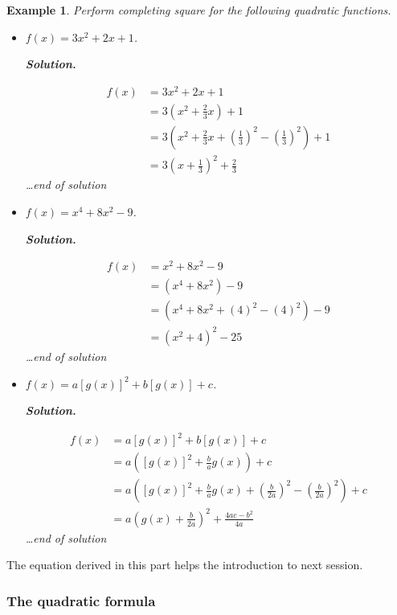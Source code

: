 \documentclass[12pt]{article}
\newtheorem*{example}{Example}
\newenvironment{solution}{\begin{snugshade*} \textbf{Solution.} \par}{\hfill \textit{\dots end of solution} \end{snugshade*}}
\begin{document}
    \begin{example}
        Perform completing square for the following quadratic functions.\begin{itemize}
            \item $f(x)=3x^2+2x+1$.\begin{solution}
                \begin{align*}
                    f(x)&=3x^2+2x+1\\
                    &=3(x^2+\frac{2}{3}x)+1\\
                    &=3(x^2+\frac{2}{3}x+(\frac{1}{3})^2-(\frac{1}{3})^2)+1\\
                    &=3(x+\frac{1}{3})^2+\frac{2}{3}
                \end{align*}
            \end{solution}
            \item $f(x)=x^4+8x^2-9$.\begin{solution}
                \begin{align*}
                    f(x)&=x^2+8x^2-9\\
                    &=(x^4+8x^2)-9\\
                    &=(x^4+8x^2+(4)^2-(4)^2)-9\\
                    &=(x^2+4)^2-25
                \end{align*}
            \end{solution}
            \item $f(x)=a[g(x)]^2+b[g(x)]+c$.\begin{solution}
                \begin{align*}
                    f(x)&=a[g(x)]^2+b[g(x)]+c\\
                    &=a([g(x)]^2+\frac{b}{a}g(x))+c\\
                    &=a([g(x)]^2+\frac{b}{a}g(x)+(\frac{b}{2a})^2-(\frac{b}{2a})^2)+c\\
                    &=a(g(x)+\frac{b}{2a})^2+\frac{4ac-b^2}{4a}
                \end{align*}
            \end{solution}
        \end{itemize}
    \end{example}

    The equation derived in this part helps the introduction to next session.

    \subsubsection*{The quadratic formula}
\end{document}

